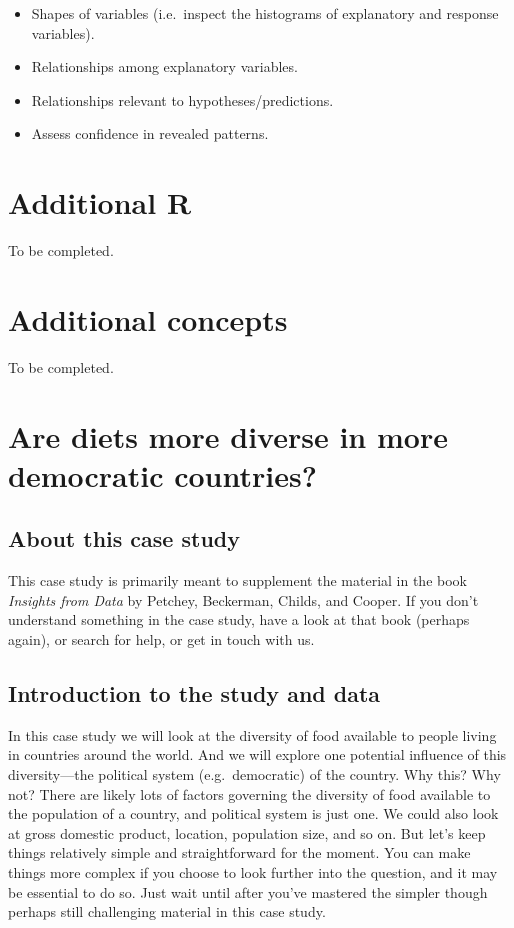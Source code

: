\documentclass[]{book}
\providecommand{\tightlist}{%
  \setlength{\itemsep}{0pt}\setlength{\parskip}{0pt}}
\begin{document}
\begin{itemize}
\tightlist
\item
  Shapes of variables (i.e.~inspect the histograms of explanatory and response variables).
\item
  Relationships among explanatory variables.
\item
  Relationships relevant to hypotheses/predictions.
\item
  Assess confidence in revealed patterns.
\end{itemize}

\hypertarget{additional-r}{%
\chapter{Additional R}\label{additional-r}}

To be completed.

\hypertarget{additional-concepts}{%
\chapter{Additional concepts}\label{additional-concepts}}

To be completed.

\hypertarget{WFD-2}{%
\chapter{Are diets more diverse in more democratic countries?}\label{WFD-2}}

\hypertarget{about-this-case-study}{%
\section{About this case study}\label{about-this-case-study}}

This case study is primarily meant to supplement the material in the book \emph{Insights from Data} by Petchey, Beckerman, Childs, and Cooper. If you don't understand something in the case study, have a look at that book (perhaps again), or search for help, or get in touch with us.

\hypertarget{introduction-to-the-study-and-data}{%
\section{Introduction to the study and data}\label{introduction-to-the-study-and-data}}

In this case study we will look at the diversity of food available to people living in countries around the world. And we will explore one potential influence of this diversity---the political system (e.g.~democratic) of the country. Why this? Why not? There are likely lots of factors governing the diversity of food available to the population of a country, and political system is just one. We could also look at gross domestic product, location, population size, and so on. But let's keep things relatively simple and straightforward for the moment. You can make things more complex if you choose to look further into the question, and it may be essential to do so. Just wait until after you've mastered the simpler though perhaps still challenging material in this case study.
\end{document}
